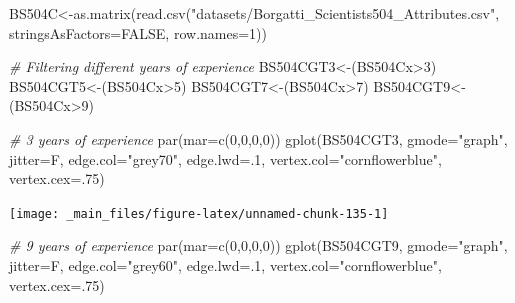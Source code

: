 \documentclass[
  notitlepage,
  onecolumn,
  openany]{book}
\newenvironment{Shaded}{\begin{snugshade}}{\end{snugshade}}
\newcommand{\AttributeTok}[1]{\textcolor[rgb]{0.77,0.63,0.00}{#1}}
\newcommand{\CommentTok}[1]{\textcolor[rgb]{0.56,0.35,0.01}{\textit{#1}}}
\newcommand{\ConstantTok}[1]{\textcolor[rgb]{0.00,0.00,0.00}{#1}}
\newcommand{\DecValTok}[1]{\textcolor[rgb]{0.00,0.00,0.81}{#1}}
\newcommand{\FunctionTok}[1]{\textcolor[rgb]{0.00,0.00,0.00}{#1}}
\newcommand{\NormalTok}[1]{#1}
\newcommand{\OtherTok}[1]{\textcolor[rgb]{0.56,0.35,0.01}{#1}}
\newcommand{\SpecialCharTok}[1]{\textcolor[rgb]{0.00,0.00,0.00}{#1}}
\newcommand{\StringTok}[1]{\textcolor[rgb]{0.31,0.60,0.02}{#1}}
\begin{document}
\begin{Shaded}
\begin{Highlighting}[]
\NormalTok{BS504C}\OtherTok{\textless{}{-}}\FunctionTok{as.matrix}\NormalTok{(}\FunctionTok{read.csv}\NormalTok{(}\StringTok{"datasets/Borgatti\_Scientists504\_Attributes.csv"}\NormalTok{,}
                           \AttributeTok{stringsAsFactors=}\ConstantTok{FALSE}\NormalTok{, }\AttributeTok{row.names=}\DecValTok{1}\NormalTok{))}

\CommentTok{\# Filtering different years of experience}
\NormalTok{BS504CGT3}\OtherTok{\textless{}{-}}\NormalTok{(BS504Cx}\SpecialCharTok{\textgreater{}}\DecValTok{3}\NormalTok{)}
\NormalTok{BS504CGT5}\OtherTok{\textless{}{-}}\NormalTok{(BS504Cx}\SpecialCharTok{\textgreater{}}\DecValTok{5}\NormalTok{)}
\NormalTok{BS504CGT7}\OtherTok{\textless{}{-}}\NormalTok{(BS504Cx}\SpecialCharTok{\textgreater{}}\DecValTok{7}\NormalTok{)}
\NormalTok{BS504CGT9}\OtherTok{\textless{}{-}}\NormalTok{(BS504Cx}\SpecialCharTok{\textgreater{}}\DecValTok{9}\NormalTok{)}
\end{Highlighting}
\end{Shaded}

\begin{Shaded}
\begin{Highlighting}[]
\CommentTok{\# 3 years of experience}
\FunctionTok{par}\NormalTok{(}\AttributeTok{mar=}\FunctionTok{c}\NormalTok{(}\DecValTok{0}\NormalTok{,}\DecValTok{0}\NormalTok{,}\DecValTok{0}\NormalTok{,}\DecValTok{0}\NormalTok{))}
\FunctionTok{gplot}\NormalTok{(BS504CGT3,}
      \AttributeTok{gmode=}\StringTok{"graph"}\NormalTok{,}
      \AttributeTok{jitter=}\NormalTok{F,}
      \AttributeTok{edge.col=}\StringTok{"grey70"}\NormalTok{, }
      \AttributeTok{edge.lwd=}\NormalTok{.}\DecValTok{1}\NormalTok{,}
      \AttributeTok{vertex.col=}\StringTok{"cornflowerblue"}\NormalTok{,}
      \AttributeTok{vertex.cex=}\NormalTok{.}\DecValTok{75}\NormalTok{)}
\end{Highlighting}
\end{Shaded}

\begin{center}\texttt{[image: \_main\_files/figure-latex/unnamed-chunk-135-1]} \end{center}

\begin{Shaded}
\begin{Highlighting}[]
\CommentTok{\# 9 years of experience}
\FunctionTok{par}\NormalTok{(}\AttributeTok{mar=}\FunctionTok{c}\NormalTok{(}\DecValTok{0}\NormalTok{,}\DecValTok{0}\NormalTok{,}\DecValTok{0}\NormalTok{,}\DecValTok{0}\NormalTok{))}
\FunctionTok{gplot}\NormalTok{(BS504CGT9,}
      \AttributeTok{gmode=}\StringTok{"graph"}\NormalTok{,}
      \AttributeTok{jitter=}\NormalTok{F,}
      \AttributeTok{edge.col=}\StringTok{"grey60"}\NormalTok{, }
      \AttributeTok{edge.lwd=}\NormalTok{.}\DecValTok{1}\NormalTok{,}
      \AttributeTok{vertex.col=}\StringTok{"cornflowerblue"}\NormalTok{,}
      \AttributeTok{vertex.cex=}\NormalTok{.}\DecValTok{75}\NormalTok{)}
\end{Highlighting}
\end{Shaded}
\end{document}
